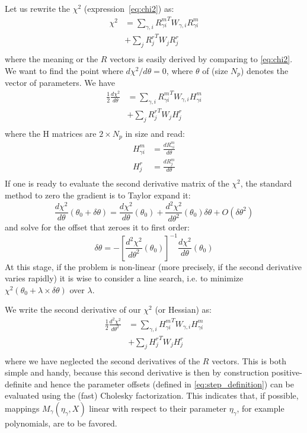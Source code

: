 \documentclass[a4paper,12pt]{scrartcl}
\begin{document}
Let us rewrite the $\chi^2$ (expression~\ref{eq:chi2}) as:
\begin{align}
\chi^2 & =  \sum_{\gamma,i}  {R^m_{\gamma i}}^T W_{\gamma,i}  R^m_{\gamma i} \nonumber \\
         & +\sum_j {R^r_{j}}^T W_{j}  R^r_{j} \label{eq:grad_chi2}\\
\end{align}
where the meaning or the $R$ vectors is easily derived by comparing to
\ref{eq:chi2}. We want to find the point where $d \chi^2/d \theta = 0$,
where $\theta$ of (size $N_p$) denotes the vector of parameters. We have
\begin{align}
\frac{1}{2} \frac{d \chi^2}{d \theta} & =  \sum_{\gamma,i}  {R^m_{\gamma i}}^T W_{\gamma,i}  H^m_{\gamma i} \\
         & +\sum_j {R^r_{j}}^T W_{j}  H^r_{j} \\
\end{align}
where the H matrices are $2 \times N_p$ in size and read:
\begin{align}
 H^m_{\gamma i} & = \frac{d {R^m_{\gamma i}}}{ d \theta} \\
  H^r_{j}     & = \frac{d {R^m_{j}}}{ d \theta} \\
\end{align}
If one is ready to evaluate the second derivative matrix of the
$\chi^2$, the standard method to zero the gradient
is to Taylor expand it:
$$
\frac{d \chi^2}{d \theta}(\theta_0+\delta\theta) = \frac{d \chi^2}{d \theta}(\theta_0) + \frac{d^2 \chi^2}{d \theta^2}(\theta_0)\delta\theta + O(\delta\theta^2)
$$  
and solve for the offset that zeroes it to first order:
\begin{equation}
\delta\theta =  - \left[ \frac{d^2 \chi^2}{d \theta^2}(\theta_0) \right]^{-1}  \frac{d \chi^2}{d \theta}(\theta_0) \label{eq:step_definition}
\end{equation}
At this stage, if the problem is non-linear (more precisely, if the
second derivative varies rapidly) it is wise to consider a line
search, i.e. to minimize $\chi^2(\theta_0 + \lambda\times
\delta\theta)$ over $\lambda$.

We write the second derivative of our $\chi^2$ (or Hessian) as:
\begin{align}
\frac{1}{2} \frac{d^2 \chi^2}{d \theta^2} & =  \sum_{\gamma,i}  {H^m_{\gamma i}}^T W_{\gamma,i}  H^m_{\gamma i} \nonumber \\
         & +\sum_j {H^r_{j}}^T W_{j}  H^r_{j} \label{eq:def_hessian}\\
\end{align}
where we have neglected the second derivatives of the $R$
vectors. This is both simple and handy, because this second derivative
is then by construction positive-definite and hence the parameter
offsets (defined in \ref{eq:step_definition}) can be evaluated using
the (fast) Cholesky factorization. This indicates that, if possible,
mappings $M_\gamma(\eta_\gamma,X)$ linear with respect to their
parameter $\eta_\gamma$, for example polynomials, are to be favored.
\end{document}
